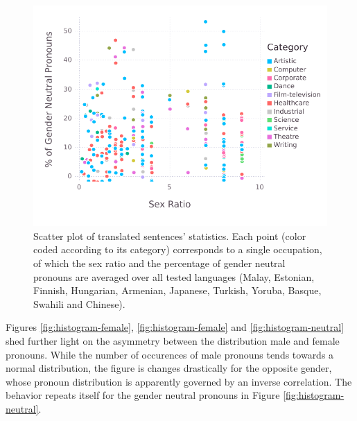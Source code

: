 \documentclass{article}
\begin{document}
\begin{figure}[H]
	\centering
	\includegraphics[width=\linewidth]{pictures/scatterplot-languages}
	\caption{Scatter plot of translated sentences' statistics. Each point (color coded according to its category) corresponds to a single occupation, of which the sex ratio and the percentage of gender neutral pronouns are averaged over all tested languages (Malay, Estonian, Finnish, Hungarian, Armenian, Japanese, Turkish, Yoruba, Basque, Swahili and Chinese).}
	\label{fig:scatterplot-languages}
\end{figure}

Figures \ref{fig:histogram-female}, \ref{fig:histogram-female} and \ref{fig:histogram-neutral} shed further light on the asymmetry between the distribution male and female pronouns. While the number of occurences of male pronouns tends towards a normal distribution, the figure is changes drastically for the opposite gender, whose pronoun distribution is apparently governed by an inverse correlation. The behavior repeats itself for the gender neutral pronouns in Figure \ref{fig:histogram-neutral}.
\end{document}
